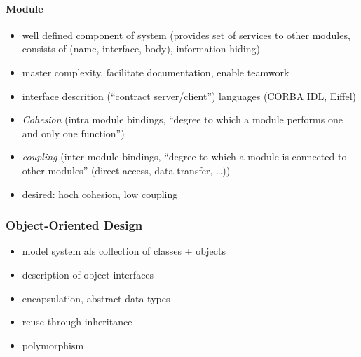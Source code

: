 \documentclass[a4paper, 10pt]{article}
\begin{document}
\paragraph*{Module}
\begin{itemize}
	\item well defined component of system (provides set of services to other modules, consists of (name, interface, body), information hiding)
	\item master complexity, facilitate documentation, enable teamwork
	\item interface descrition (``contract server/client'') languages (CORBA IDL, Eiffel)
	\item \emph{Cohesion} (intra module bindings, ``degree to which a module performs one and only one function'')
	\item \emph{coupling} (inter module bindings, ``degree to which a module is connected to other modules'' (direct access, data transfer, \dots))
	\item desired: hoch cohesion, low coupling
\end{itemize}

\subsubsection*{Object-Oriented Design}
\begin{itemize}
	\item model system als collection of classes + objects
	\item description of object interfaces
	\item encapsulation, abstract data types
	\item reuse through inheritance
	\item polymorphism
\end{itemize}
\end{document}
